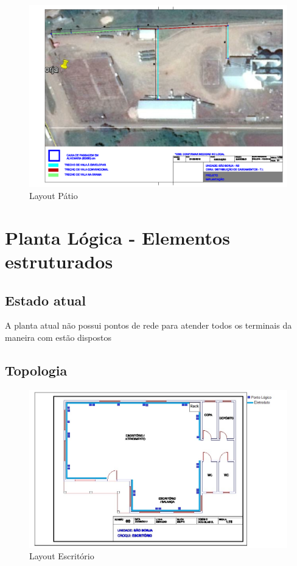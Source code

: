 \documentclass[	DIV=calc,%
							paper=a4,%
							fontsize=12pt,%
							onecolumn]{scrartcl}	 					%
\begin{document}
\begin{figure}
	\centering
	\includegraphics[width=\textwidth]{fig2}
	\caption{Layout Pátio}
	\label{fig2}
\end{figure}

\section{Planta Lógica - Elementos estruturados}

\subsection{Estado atual}
A planta atual não possui pontos de rede para atender todos os terminais da maneira com estão dispostos

\subsection{Topologia}

\begin{figure}
	\centering
	\includegraphics[width=\textwidth]{fig3}
	\caption{Layout Escritório}
	\label{fig3}
\end{figure}
\end{document}
